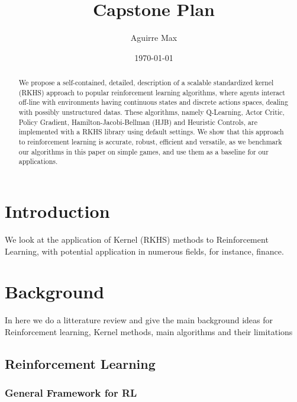 \documentclass[
]{article}
\author{}
\date{\vspace{-2.5em}}
\title{\textbf{Capstone Plan}}
\author[1]{Aguirre Max}
\affil[1]{PSTB, Paris, France}
\date{\today} %
\numberwithin{equation}{section}
\begin{document}
\maketitle %

\begin{abstract}
We propose a self-contained, detailed, description of a scalable standardized kernel (RKHS) approach to popular reinforcement learning algorithms, where agents interact off-line with environments having continuous states and discrete actions spaces, dealing with possibly unstructured datas. These algorithms, namely Q-Learning, Actor Critic, Policy Gradient, Hamilton-Jacobi-Bellman (HJB) and Heuristic Controls, are implemented with a RKHS library \cite{codpy} using default settings. We show that this approach to reinforcement learning is accurate, robust, efficient and versatile, as we benchmark our algorithms in this paper on simple games, and use them as a baseline for our applications.
\end{abstract}

\hypertarget{Introduction}{%
\section{Introduction}\label{Introduction}}

We look at the application of Kernel (RKHS) methods to Reinforcement Learning, with potential application in numerous fields, for instance, finance.

\hypertarget{Background}{%
\section{Background}\label{Background}} 

In here we do a litterature review and give the main background ideas for Reinforcement learning, Kernel methods, main algorithms and their limitations

\hypertarget{Reinforcement-learning}{%
\subsection{Reinforcement Learning}\label{Reinforcement-learning}}

\hypertarget{General framework for RL}{%
\subsubsection{General Framework for RL}\label{General framework for RL}}
\end{document}
